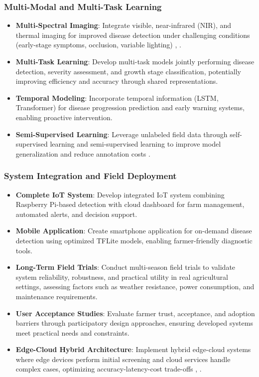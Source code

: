 \subsubsection{Multi-Modal and Multi-Task Learning}

\begin{itemize}
\item \textbf{Multi-Spectral Imaging}: Integrate visible, near-infrared (NIR), and thermal imaging for improved disease detection under challenging conditions (early-stage symptoms, occlusion, variable lighting) \cite{15}, \cite{63}.

\item \textbf{Multi-Task Learning}: Develop multi-task models jointly performing disease detection, severity assessment, and growth stage classification, potentially improving efficiency and accuracy through shared representations.

\item \textbf{Temporal Modeling}: Incorporate temporal information (LSTM, Transformer) for disease progression prediction and early warning systems, enabling proactive intervention.

\item \textbf{Semi-Supervised Learning}: Leverage unlabeled field data through self-supervised learning and semi-supervised learning to improve model generalization and reduce annotation costs \cite{53}.
\end{itemize}

\subsubsection{System Integration and Field Deployment}

\begin{itemize}
\item \textbf{Complete IoT System}: Develop integrated IoT system combining Raspberry Pi-based detection with cloud dashboard for farm management, automated alerts, and decision support.

\item \textbf{Mobile Application}: Create smartphone application for on-demand disease detection using optimized TFLite models, enabling farmer-friendly diagnostic tools.

\item \textbf{Long-Term Field Trials}: Conduct multi-season field trials to validate system reliability, robustness, and practical utility in real agricultural settings, assessing factors such as weather resistance, power consumption, and maintenance requirements.

\item \textbf{User Acceptance Studies}: Evaluate farmer trust, acceptance, and adoption barriers through participatory design approaches, ensuring developed systems meet practical needs and constraints.

\item \textbf{Edge-Cloud Hybrid Architecture}: Implement hybrid edge-cloud systems where edge devices perform initial screening and cloud services handle complex cases, optimizing accuracy-latency-cost trade-offs \cite{13}, \cite{61}.
\end{itemize}

